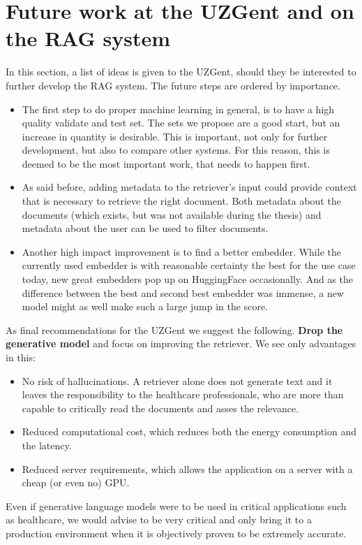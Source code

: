 \section{Future work at the UZGent and on the RAG system}
In this section, a list of ideas is given to the UZGent, should they be interested to further develop the RAG system. The future steps are ordered by importance.

\begin{itemize}
    \item The first step to do proper machine learning in general, is to have a high quality validate and test set. The sets we propose are a good start, but an increase in quantity is desirable. This is important, not only for further development, but also to compare other systems. For this reason, this is deemed to be the most important work, that needs to happen first. 
    \item As said before, adding metadata to the retriever's input could provide context that is necessary to retrieve the right document. Both metadata about the documents (which exists, but was not available during the thesis) and metadata about the user can be used to filter documents. 
    \item Another high impact improvement is to find a better embedder. While the currently used embedder is with reasonable certainty the best for the use case today, new great embedders pop up on HuggingFace occasionally. And as the difference between the best and second best embedder was immense, a new model might as well make such a large jump in the score.
\end{itemize}

As final recommendations for the UZGent we suggest the following. \textbf{Drop the generative model} and focus on improving the retriever. We see only advantages in this:
\begin{itemize}
    \item No risk of hallucinations. A retriever alone does not generate text and it leaves the responsibility to the healthcare professionals, who are more than capable to critically read the documents and asses the relevance.
    \item Reduced computational cost, which reduces both the energy consumption and the latency.
    \item Reduced server requirements, which allows the application on a server with a cheap (or even no) GPU.
\end{itemize}
Even if generative language models were to be used in critical applications such as healthcare, we would advise to be very critical and only bring it to a production environment when it is objectively proven to be extremely accurate.

